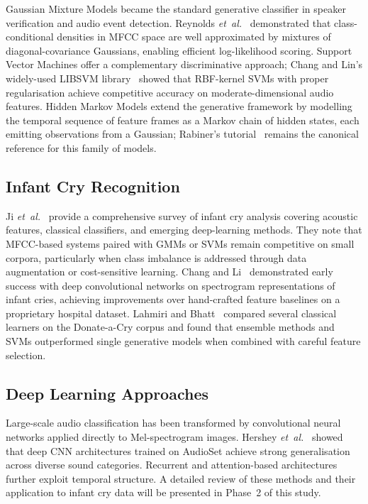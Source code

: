 \documentclass[conference]{IEEEtran}
\begin{document}
Gaussian Mixture Models became the standard generative classifier in
speaker verification and audio event detection.  Reynolds
\textit{et~al.}~\cite{reynolds2000speaker} demonstrated that
class-conditional densities in MFCC space are well approximated by
mixtures of diagonal-covariance Gaussians, enabling efficient
log-likelihood scoring.  Support Vector Machines offer a complementary
discriminative approach; Chang and Lin's widely-used LIBSVM
library~\cite{chang2011libsvm} showed that RBF-kernel SVMs with proper
regularisation achieve competitive accuracy on moderate-dimensional audio
features.  Hidden Markov Models extend the generative framework by
modelling the temporal sequence of feature frames as a Markov chain of
hidden states, each emitting observations from a Gaussian; Rabiner's
tutorial~\cite{rabiner1989hmm} remains the canonical reference for this
family of models.

\subsection{Infant Cry Recognition}
\label{sec:related_cry}

Ji \textit{et~al.}~\cite{ji2021review} provide a comprehensive survey
of infant cry analysis covering acoustic features, classical classifiers,
and emerging deep-learning methods.  They note that MFCC-based systems
paired with GMMs or SVMs remain competitive on small corpora,
particularly when class imbalance is addressed through data augmentation
or cost-sensitive learning.  Chang and Li~\cite{chang2017infant}
demonstrated early success with deep convolutional networks on
spectrogram representations of infant cries, achieving improvements over
hand-crafted feature baselines on a proprietary hospital dataset.
Lahmiri and Bhatt~\cite{lahmiri2022infant} compared several classical
learners on the Donate-a-Cry corpus and found that ensemble methods and
SVMs outperformed single generative models when combined with careful
feature selection.

\subsection{Deep Learning Approaches}
\label{sec:related_dl}

Large-scale audio classification has been transformed by convolutional
neural networks applied directly to Mel-spectrogram images.  Hershey
\textit{et~al.}~\cite{hershey2017cnn} showed that deep CNN
architectures trained on AudioSet achieve strong generalisation across
diverse sound categories.  Recurrent and attention-based architectures
further exploit temporal structure.  A detailed review of these methods
and their application to infant cry data will be presented in Phase~2 of
this study.
\end{document}
